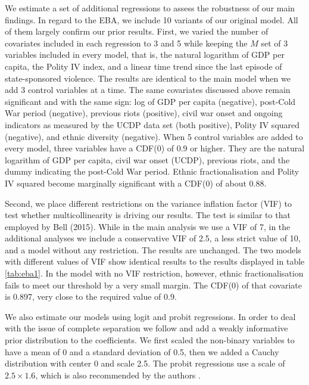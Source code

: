 We estimate a set of additional regressions to assess the robustness of our main findings. In regard to the EBA, we include 10 variants of our original model. All of them largely confirm our prior results. First, we varied the number of covariates included in each regression to 3 and 5 while keeping the $M$ set of 3 variables included in every model, that is, the natural logarithm of GDP per capita, the Polity IV index, and a linear time trend since the last episode of state-sponsored violence. The results are identical to the main model when we add 3 control variables at a time. The same covariates discussed above remain significant and with the same sign: log of GDP per capita (negative), post-Cold War period (negative), previous riots (positive), civil war onset and ongoing indicators as measured by the UCDP data set (both positive), Polity IV squared (negative), and ethnic diversity (negative). When 5 control variables are added to every model, three variables have a CDF(0) of 0.9 or higher. They are the natural logarithm of GDP per capita, civil war onset (UCDP), previous riots, and the dummy indicating the post-Cold War period. Ethnic fractionalisation and Polity IV squared become marginally significant with a CDF(0) of about 0.88.

Second, we place different restrictions on the variance inflation factor (VIF) to test whether multicollinearity is driving our results. The test is similar to that employed by Bell (2015). While in the main analysis we use a VIF of 7, in the additional analyses we include a conservative VIF of 2.5, a less strict value of 10, and a model without any restriction. The results are unchanged. The two models with different values of VIF show identical results to the results displayed in table \ref{tab:eba1}. In the model with no VIF restriction, however, ethnic fractionalisation fails to meet our threshold by a very small margin. The CDF(0) of that covariate is 0.897, very close to the required value of 0.9.

We also estimate our models using logit and probit regressions. In order to deal with the issue of complete separation \citep{bell2015questioning,zorn2005solution} we follow \citet{gelman2008weakly} and add a weakly informative prior distribution to the coefficients. We first scaled the non-binary variables to have a mean of 0 and a standard deviation of 0.5, then we added a Cauchy distribution with center 0 and scale 2.5. The probit regressions use a scale of $2.5 \times 1.6$, which is also recommended by the authors \citep{arm2017rpackage}.

